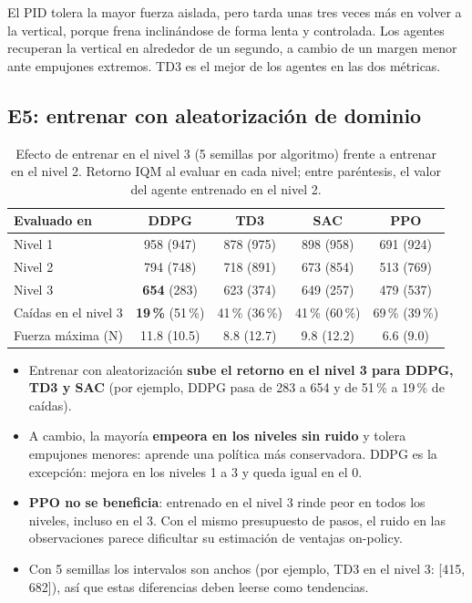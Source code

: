 \documentclass[11pt,a4paper]{article}
\newcommand{\best}[1]{\textbf{#1}}
\begin{document}
El PID tolera la mayor fuerza aislada, pero tarda unas tres veces más en volver a la vertical, porque frena inclinándose de forma lenta y controlada. Los agentes recuperan la vertical en alrededor de un segundo, a cambio de un margen menor ante empujones extremos. TD3 es el mejor de los agentes en las dos métricas.

\subsection{E5: entrenar con aleatorización de dominio}

\begin{table}[H]
\centering
\caption{Efecto de entrenar en el nivel 3 (5 semillas por algoritmo) frente a entrenar en el nivel 2. Retorno IQM al evaluar en cada nivel; entre paréntesis, el valor del agente entrenado en el nivel 2.}
\label{tab:e5}
\small
\begin{tabular}{@{}lcccc@{}}
\toprule
Evaluado en & DDPG & TD3 & SAC & PPO \\
\midrule
Nivel 1 & 958 (947) & 878 (975) & 898 (958) & 691 (924) \\
Nivel 2 & 794 (748) & 718 (891) & 673 (854) & 513 (769) \\
Nivel 3 & \best{654} (283) & 623 (374) & 649 (257) & 479 (537) \\
Caídas en el nivel 3 & \best{19\,\%} (51\,\%) & 41\,\% (36\,\%) & 41\,\% (60\,\%) & 69\,\% (39\,\%) \\
Fuerza máxima (N) & 11.8 (10.5) & 8.8 (12.7) & 9.8 (12.2) & 6.6 (9.0) \\
\bottomrule
\end{tabular}
\end{table}

\begin{itemize}
  \item Entrenar con aleatorización \textbf{sube el retorno en el nivel 3 para DDPG, TD3 y SAC} (por ejemplo, DDPG pasa de 283 a 654 y de 51\,\% a 19\,\% de caídas).
  \item A cambio, la mayoría \textbf{empeora en los niveles sin ruido} y tolera empujones menores: aprende una política más conservadora. DDPG es la excepción: mejora en los niveles 1 a 3 y queda igual en el 0.
  \item \textbf{PPO no se beneficia}: entrenado en el nivel 3 rinde peor en todos los niveles, incluso en el 3. Con el mismo presupuesto de pasos, el ruido en las observaciones parece dificultar su estimación de ventajas on-policy.
  \item Con 5 semillas los intervalos son anchos (por ejemplo, TD3 en el nivel 3: [415, 682]), así que estas diferencias deben leerse como tendencias.
\end{itemize}
\end{document}
